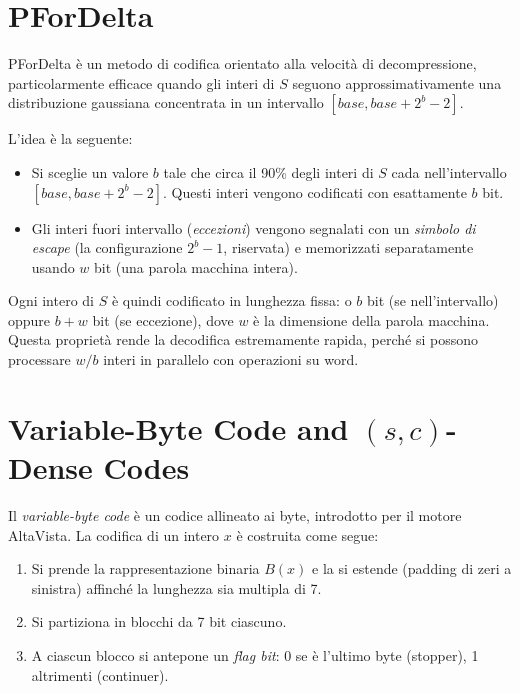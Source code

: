 \documentclass[12pt, a4paper, oneside]{book}
\theoremstyle{plain}
\theoremstyle{definition}
\theoremstyle{remark}
\begin{document}
\section{PForDelta}
\label{sec:pfordelta}

PForDelta è un metodo di codifica orientato alla velocità di decompressione, particolarmente efficace quando gli interi di $S$ seguono approssimativamente una distribuzione gaussiana concentrata in un intervallo $[\mathit{base}, \mathit{base} + 2^b - 2]$.

L'idea è la seguente:
\begin{itemize}
  \item Si sceglie un valore $b$ tale che circa il 90\% degli interi di $S$ cada nell'intervallo $[base, base + 2^b - 2]$. Questi interi vengono codificati con esattamente $b$ bit.
  \item Gli interi fuori intervallo (\emph{eccezioni}) vengono segnalati con un \emph{simbolo di escape} (la configurazione $2^b - 1$, riservata) e memorizzati separatamente usando $w$ bit (una parola macchina intera).
\end{itemize}

Ogni intero di $S$ è quindi codificato in lunghezza fissa: o $b$ bit (se nell'intervallo) oppure $b + w$ bit (se eccezione), dove $w$ è la dimensione della parola macchina. Questa proprietà rende la decodifica estremamente rapida, perché si possono processare $w/b$ interi in parallelo con operazioni su word.

\section{Variable-Byte Code and $(s,c)$-Dense Codes}
\label{sec:vbyte}

Il \emph{variable-byte code} è un codice allineato ai byte, introdotto per il motore AltaVista. La codifica di un intero $x$ è costruita come segue:
\begin{enumerate}
  \item Si prende la rappresentazione binaria $B(x)$ e la si estende (padding di zeri a sinistra) affinché la lunghezza sia multipla di 7.
  \item Si partiziona in blocchi da 7 bit ciascuno.
  \item A ciascun blocco si antepone un \emph{flag bit}: 0 se è l'ultimo byte (stopper), 1 altrimenti (continuer).
\end{enumerate}
\end{document}
